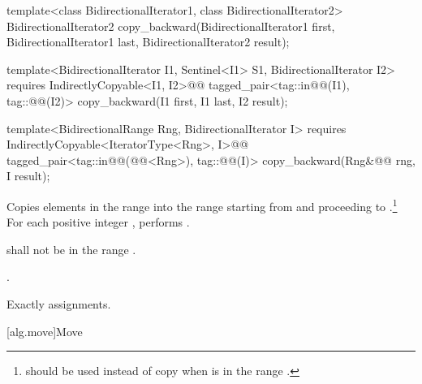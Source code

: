 %
\begin{removedblock}
\begin{itemdecl}
template<class BidirectionalIterator1, class BidirectionalIterator2>
  BidirectionalIterator2
    copy_backward(BidirectionalIterator1 first,
                  BidirectionalIterator1 last,
                  BidirectionalIterator2 result);
\end{itemdecl}
\end{removedblock}
\begin{addedblock}
\begin{itemdecl}
template<BidirectionalIterator I1, Sentinel<I1> S1, BidirectionalIterator I2>
  requires IndirectlyCopyable<I1, I2>@\newtxt{()}@
  tagged_pair<tag::in@@(I1), tag::@@(I2)>
    copy_backward(I1 first, I1 last, I2 result);

template<BidirectionalRange Rng, BidirectionalIterator I>
  requires IndirectlyCopyable<IteratorType<Rng>, I>@\newtxt{()}@
  tagged_pair<tag::in@@(@@<Rng>), tag::@@(I)>
    copy_backward(Rng&@\newtxt{\&}@ rng, I result);
\end{itemdecl}
\end{addedblock}

\begin{itemdescr}
\pnum
\effects
Copies elements in the range 
into the
range 
starting from
and proceeding to .\footnote{
should be used instead of copy when 
is in
the range
.}
For each positive integer
,
performs
.

\pnum
\requires
{}
shall not be in the range
.

\pnum
\returns
{}.

\pnum
\complexity
Exactly
assignments.
\end{itemdescr}

[alg.move]{Move}

